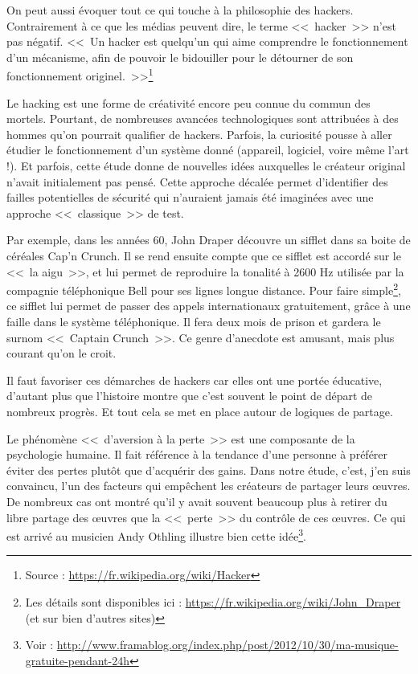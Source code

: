 On peut aussi évoquer tout ce qui touche à la philosophie des hackers.
Contrairement à ce que les médias peuvent dire, le terme <<~hacker~>> n'est pas négatif.
<<~Un hacker est quelqu'un qui aime comprendre le fonctionnement d'un mécanisme, afin de pouvoir le bidouiller pour le détourner de son fonctionnement originel.~>>\footnote{Source : \url{https://fr.wikipedia.org/wiki/Hacker}}

Le hacking est une forme de créativité encore peu connue du commun des mortels.
Pourtant, de nombreuses avancées technologiques sont attribuées à des hommes qu'on pourrait qualifier de hackers.
Parfois, la curiosité pousse à aller étudier le fonctionnement d'un système donné (appareil, logiciel, voire même l'art !).
Et parfois, cette étude donne de nouvelles idées auxquelles le créateur original n'avait initialement pas pensé.
Cette approche décalée permet d'identifier des failles potentielles de sécurité qui n'auraient jamais été imaginées avec une approche <<~classique~>> de test.

Par exemple, dans les années 60, John Draper découvre un sifflet dans sa boite de céréales Cap'n Crunch.
Il se rend ensuite compte que ce sifflet est accordé sur le <<~la aigu~>>, et lui permet de reproduire la tonalité à 2600 Hz utilisée par la compagnie téléphonique Bell pour ses lignes longue distance.
Pour faire simple\footnote{Les détails sont disponibles ici : \url{https://fr.wikipedia.org/wiki/John_Draper} (et sur bien d'autres sites)}, ce sifflet lui permet de passer des appels internationaux gratuitement, grâce à une faille dans le système téléphonique.
Il fera deux mois de prison et gardera le surnom <<~Captain Crunch~>>.
Ce genre d'anecdote est amusant, mais plus courant qu'on le croit.

Il faut favoriser ces démarches de hackers car elles ont une portée éducative, d'autant plus que l'histoire montre que c'est souvent le point de départ de nombreux progrès.
Et tout cela se met en place autour de logiques de partage.

Le phénomène <<~d'aversion à la perte~>> est une composante de la psychologie humaine.
Il fait référence à la tendance d'une personne à préférer éviter des pertes plutôt que d'acquérir des gains.
Dans notre étude, c'est, j'en suis convaincu, l'un des facteurs qui empêchent les créateurs de partager leurs œuvres.
De nombreux cas ont montré qu'il y avait souvent beaucoup plus à retirer du libre partage des œuvres que la <<~perte~>> du contrôle de ces œuvres.
Ce qui est arrivé au musicien Andy Othling illustre bien cette idée\footnote{Voir : \url{http://www.framablog.org/index.php/post/2012/10/30/ma-musique-gratuite-pendant-24h}}.

